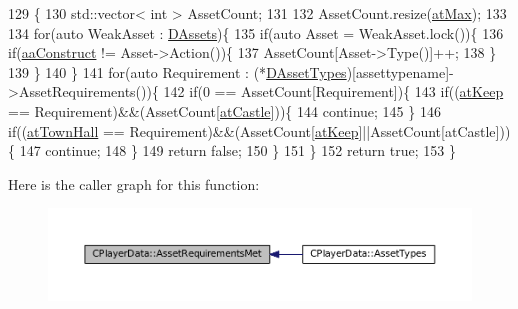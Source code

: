 \begin{DoxyCode}
129                                                                     \{
130     std::vector< int > AssetCount;
131     
132     AssetCount.resize(\hyperlink{GameDataTypes_8h_a5600d4fc433b83300308921974477feca92fbf60b4e5c335160f915b6a1c17c05}{atMax});
133     
134     \textcolor{keywordflow}{for}(\textcolor{keyword}{auto} WeakAsset : \hyperlink{classCPlayerData_a1d7dd355facf52db6242e3554373906c}{DAssets})\{
135         \textcolor{keywordflow}{if}(\textcolor{keyword}{auto} Asset = WeakAsset.lock())\{
136             \textcolor{keywordflow}{if}(\hyperlink{GameDataTypes_8h_ab47668e651a3032cfb9c40ea2d60d670a7ef6b863f66dd7dcc95a199cd758ae1d}{aaConstruct} != Asset->Action())\{
137                 AssetCount[Asset->Type()]++;
138             \}
139         \}
140     \}
141     \textcolor{keywordflow}{for}(\textcolor{keyword}{auto} Requirement : (*\hyperlink{classCPlayerData_ad922f283c60b1c885dac955815ae2b05}{DAssetTypes})[assettypename]->AssetRequirements())\{
142         \textcolor{keywordflow}{if}(0 == AssetCount[Requirement])\{
143             \textcolor{keywordflow}{if}((\hyperlink{GameDataTypes_8h_a5600d4fc433b83300308921974477fecaaed39451bedb0392ad95fbc9c95bef31}{atKeep} == Requirement)&&(AssetCount[\hyperlink{GameDataTypes_8h_a5600d4fc433b83300308921974477feca6727b47855e74f3f7b6e4a96d0c2a42a}{atCastle}]))\{
144                 \textcolor{keywordflow}{continue};               
145             \}
146             \textcolor{keywordflow}{if}((\hyperlink{GameDataTypes_8h_a5600d4fc433b83300308921974477feca5c0fa8a0f367f3358365536d3c7aa321}{atTownHall} == Requirement)&&(AssetCount[\hyperlink{GameDataTypes_8h_a5600d4fc433b83300308921974477fecaaed39451bedb0392ad95fbc9c95bef31}{atKeep}]||AssetCount[atCastle]))\{
147                 \textcolor{keywordflow}{continue};               
148             \}
149             \textcolor{keywordflow}{return} \textcolor{keyword}{false};    
150         \}
151     \}
152     \textcolor{keywordflow}{return} \textcolor{keyword}{true};
153 \}
\end{DoxyCode}
Here is the caller graph for this function\+:\nopagebreak
\begin{figure}[H]
\begin{center}
\leavevmode
\includegraphics[width=350pt]{classCPlayerData_a21238056db09447e0ed054aafbd953c1_icgraph}
\end{center}
\end{figure}
\hypertarget{classCPlayerData_a9715c8a64e26d669556b029901ec5ab5}{}\label{classCPlayerData_a9715c8a64e26d669556b029901ec5ab5} 
